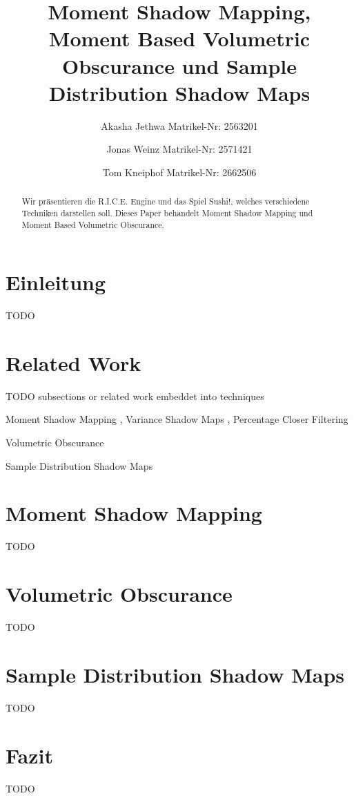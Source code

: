 \documentclass[runningheaders,a4paper]{llncs}
\title{ Moment Shadow Mapping, Moment Based Volumetric Obscurance und Sample Distribution Shadow Maps }
\author{
	Akasha Jethwa 
	Matrikel-Nr: 2563201
	\and
	Jonas Weinz 
	Matrikel-Nr: 2571421
	\and
	Tom Kneiphof 
	Matrikel-Nr: 2662506
}
\institute{Institut für Informatik der Universität Bonn}
\begin{document}
\maketitle

\begin{abstract}
    Wir präsentieren die R.I.C.E. Engine und das Spiel Sushi!, welches verschiedene Techniken darstellen soll. Dieses Paper behandelt Moment Shadow Mapping und Moment Based Volumetric Obscurance.
\end{abstract}

\section{Einleitung}

	TODO

\section{Related Work}

TODO subsections or related work embeddet into techniques

Moment Shadow Mapping \cite{peters2015moment}, Variance Shadow Maps \cite{donnelly2006variance}, Percentage Closer Filtering \cite{reeves1987rendering}

Volumetric Obscurance \cite{loos2010volumetric}

Sample Distribution Shadow Maps \cite{lauritzen2011sample}


\section{Moment Shadow Mapping}

	TODO

\section{Volumetric Obscurance}

	TODO

\section{Sample Distribution Shadow Maps}

	TODO

\section{Fazit}

	TODO



\end{document}
